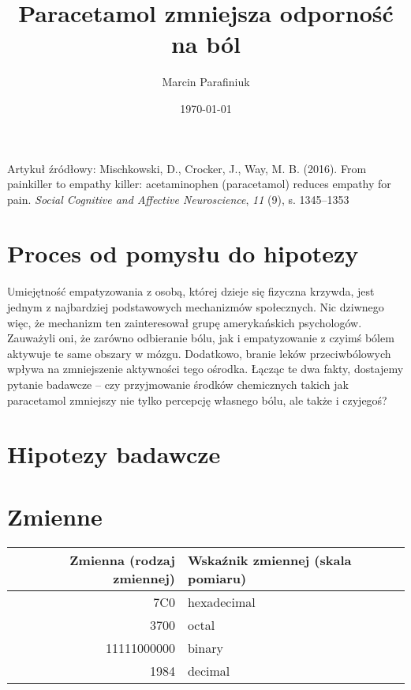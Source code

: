 \documentclass[12pt]{article}
\title{Paracetamol zmniejsza odporność na ból}
\author{Marcin Parafiniuk}
\date{\today}
\newcommand{\bb}[1]{$\mathbb{#1}$}
\newcommand{\apaartykul}[7]{#1 (#2). #3. \textit{#4}, \textit{#5} (#6), s. #7}
\begin{document}
\maketitle

Artykuł źródłowy: 
\apaartykul{Mischkowski, D., Crocker, J., Way, M. B.}{2016}{From painkiller to empathy killer: acetaminophen (paracetamol) reduces empathy for pain}{Social Cognitive and Affective Neuroscience}{11}{9}{1345–1353}

\section{Proces od pomysłu do hipotezy}

\bb{U}miejętność empatyzowania z osobą, której dzieje się fizyczna krzywda, jest jednym z najbardziej
podstawowych mechanizmów społecznych. Nic dziwnego więc, że mechanizm ten zainteresował grupę
amerykańskich psychologów. Zauważyli oni, że zarówno odbieranie bólu, jak i empatyzowanie z
czyimś bólem aktywuje te same obszary w mózgu. Dodatkowo, branie leków przeciwbólowych
wpływa na zmniejszenie aktywności tego ośrodka. Łącząc te dwa fakty, dostajemy pytanie badawcze –
czy przyjmowanie środków chemicznych takich jak paracetamol zmniejszy nie tylko percepcję
własnego bólu, ale także i czyjegoś?

\section{Hipotezy badawcze}

\section{Zmienne}

\begin{tabular}{|r|l|}
  \hline
  \textbf{Zmienna (rodzaj zmiennej)} & \textbf{Wskaźnik zmiennej (skala pomiaru)} \\
  \hline
  7C0 & hexadecimal \\
  \hline
  3700 & octal \\
  \hline
  11111000000 & binary \\
  \hline
  1984 & decimal \\
  \hline
\end{tabular}
\end{document}
